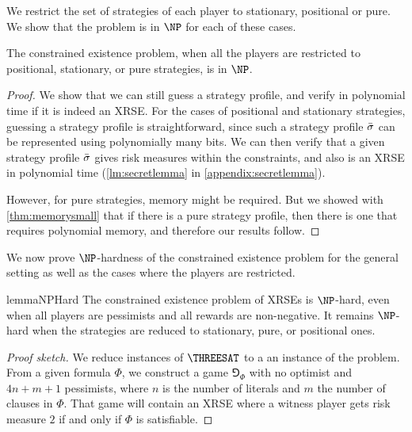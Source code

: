 We restrict the set of strategies of each player to stationary, positional or pure. 
We show that the problem is in $\NP$ for each of these cases.
\begin{lemma}\label{lm:restrictionsNPeasy}
    The constrained existence problem, when all the players are restricted to positional, stationary, or pure strategies, is in $\NP$. 
\end{lemma}
\begin{proof}
    We show that we can still guess a strategy profile, and verify in polynomial time if it is indeed an XRSE.
    For the cases of positional and stationary strategies, guessing a strategy profile is straightforward, since such a strategy profile ${\bar{\sigma}}$ can be represented using polynomially many bits.%
    We can  then verify that a given strategy profile ${\bar{\sigma}}$ gives risk measures within the constraints, and also is an XRSE in polynomial time (\cref{lm:secretlemma} in \cref{appendix:secretlemma}). 

    However, for pure strategies, memory might be required. But we showed with \cref{thm:memorysmall} that if there is a pure strategy profile, then there is one that requires polynomial memory, and therefore our results follow.  
\end{proof}
We now prove $\NP$-hardness of the constrained existence problem for the general setting as well as the cases where the players are restricted. 

\begin{restatable}{lemma}{NPHard}\label{lemma:np_hardness}
    The constrained existence problem of XRSEs
    is $\NP$-hard, even when all players are pessimists and all rewards are non-negative.
    It remains $\NP$-hard when the strategies are reduced to stationary, pure, or positional ones.
\end{restatable}

\begin{proof}[Proof sketch]
     We reduce instances of $\THREESAT$ to a an instance of the problem. From a given formula $\Phi$, we construct  a game $\Game_\Phi$
    with no optimist and $4n+m+1$ pessimists, where $n$ is the number of literals and $m$ the number of clauses in $\Phi$.
    That game will contain an XRSE where a witness player gets risk measure $2$ if and only if $\Phi$ is satisfiable.
\end{proof}
 
